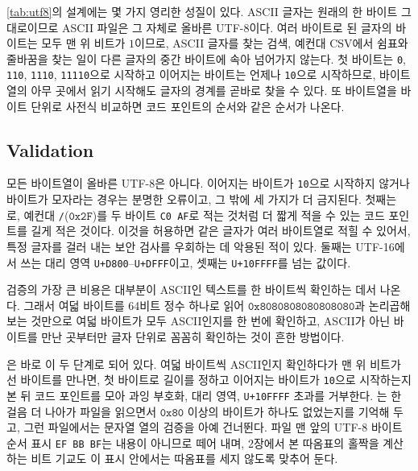 \cref{tab:utf8}의 설계에는 몇 가지 영리한 성질이 있다. ASCII 글자는 원래의 한 바이트 그대로이므로 ASCII 파일은 그 자체로 올바른 UTF-8이다. 여러 바이트로 된 글자의 바이트는 모두 맨 위 비트가 $1$이므로, ASCII 글자를 찾는 검색, 예컨대 CSV에서 쉼표와 줄바꿈을 찾는 일이 다른 글자의 중간 바이트에 속아 넘어가지 않는다. 첫 바이트는 \texttt{0}, \texttt{110}, \texttt{1110}, \texttt{11110}으로 시작하고 이어지는 바이트는 언제나 \texttt{10}으로 시작하므로, 바이트열의 아무 곳에서 읽기 시작해도 글자의 경계를 곧바로 찾을 수 있다. 또 바이트열을 바이트 단위로 사전식 비교하면 코드 포인트의 순서와 같은 순서가 나온다.

\subsection{Validation}

모든 바이트열이 올바른 UTF-8은 아니다. 이어지는 바이트가 \texttt{10}으로 시작하지 않거나 바이트가 모자라는 경우는 분명한 오류이고, 그 밖에 세 가지가 더 금지된다. 첫째는 로, 예컨대 \texttt{/}($\mathtt{0x2F}$)를 두 바이트 \texttt{C0 AF}로 적는 것처럼 더 짧게 적을 수 있는 코드 포인트를 길게 적은 것이다. 이것을 허용하면 같은 글자가 여러 바이트열로 적힐 수 있어서, 특정 글자를 걸러 내는 보안 검사를 우회하는 데 악용된 적이 있다. 둘째는 UTF-16에서 쓰는 대리 영역 \texttt{U+D800}--\texttt{U+DFFF}이고, 셋째는 \texttt{U+10FFFF}를 넘는 값이다\cite{rfc3629}.

검증의 가장 큰 비용은 대부분이 ASCII인 텍스트를 한 바이트씩 확인하는 데서 나온다. 그래서 여덟 바이트를 64비트 정수 하나로 읽어 $\mathtt{0x8080808080808080}$과 논리곱해 보는 것만으로 여덟 바이트가 모두 ASCII인지를 한 번에 확인하고, ASCII가 아닌 바이트를 만난 곳부터만 글자 단위로 꼼꼼히 확인하는 것이 흔한 방법이다.

\begin{instardust}
은 바로 이 두 단계로 되어 있다. 여덟 바이트씩 ASCII인지 확인하다가 맨 위 비트가 선 바이트를 만나면, 첫 바이트로 길이를 정하고 이어지는 바이트가 \texttt{10}으로 시작하는지 본 뒤 코드 포인트를 모아 과잉 부호화, 대리 영역, \texttt{U+10FFFF} 초과를 거부한다. 는 한 걸음 더 나아가 파일을 읽으면서 $\mathtt{0x80}$ 이상의 바이트가 하나도 없었는지를 기억해 두고, 그런 파일에서는 문자열 열의 검증을 아예 건너뛴다. 파일 맨 앞의 UTF-8 바이트 순서 표시 \texttt{EF BB BF}는 내용이 아니므로 떼어 내며, 2장에서 본 따옴표의 홀짝을 계산하는 비트 기교도 이 표시 안에서는 따옴표를 세지 않도록 맞추어 둔다.
\end{instardust}

